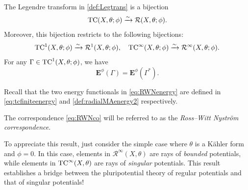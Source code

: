 \begin{theorem}\label{thm:Legenbij}
    The Legendre transform in \cref{def:Legtrans} is a bijection
    \begin{equation}\label{eq:RWNco}
        \mathrm{TC}(X,\theta;\phi)\xrightarrow{\sim} \mathcal{R}(X,\theta;\phi).
    \end{equation}
    Moreover, this bijection restricts to the following bijections:
    \begin{equation}\label{eq:RWNcotwocases}
    \mathrm{TC}^1(X,\theta;\phi)\xrightarrow{\sim} \mathcal{R}^1(X,\theta;\phi),\quad \mathrm{TC}^{\infty}(X,\theta;\phi)\xrightarrow{\sim} \mathcal{R}^{\infty}(X,\theta;\phi).
    \end{equation}
    For any $\Gamma\in \mathrm{TC}^1(X,\theta;\phi)$, we have
    \begin{equation}\label{eq:RWNenergy}
    \mathbf{E}^{\phi}(\Gamma)=\mathbf{E}^{\phi}(\Gamma^*).
    \end{equation}
\end{theorem}
Recall that the two energy functionals in \eqref{eq:RWNenergy} are defined in \eqref{eq:tcfiniteenergy} and \cref{def:radialMAenergy2} respectively.

The correspondence \eqref{eq:RWNco} will be referred to as the \emph{Ross--Witt Nyström correspondence}.

To appreciate this result, just consider the simple case where $\theta$ is a Kähler form and $\phi=0$. In this case, elements in $\mathcal{R}^{\infty}(X,\theta)$ are rays of \emph{bounded} potentials, while elements in $\mathrm{TC}^{\infty}(X,\theta)$ are rays of \emph{singular} potentials. This result establishes a bridge between the pluripotential theory of regular potentials and that of singular potentials!

